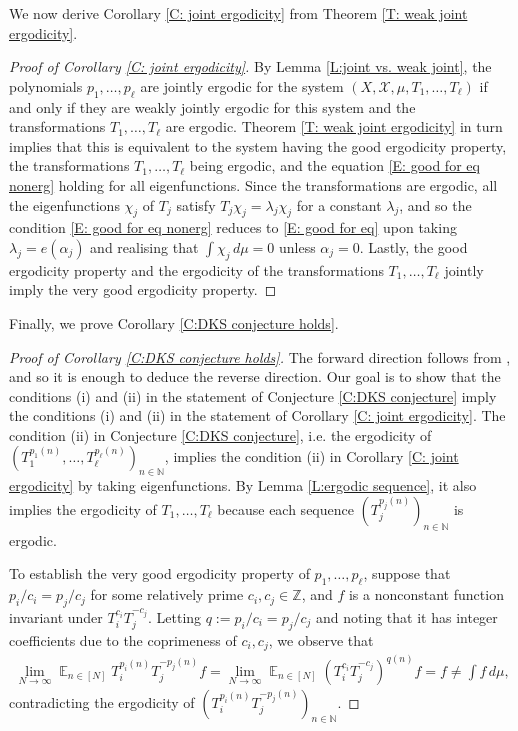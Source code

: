 \documentclass[11pt]{amsart}
\theoremstyle{definition}
\newcommand{\N}{{\mathbb N}}
\newcommand{\Z}{{\mathbb Z}}
\newcommand{\CX}{{\mathcal X}}
\DeclareMathOperator*{\E}{\mathbb{E}}
\begin{document}
We now derive Corollary \ref{C: joint ergodicity} from Theorem \ref{T: weak joint ergodicity}.
\begin{proof}[Proof of Corollary \ref{C: joint ergodicity}]
By Lemma \ref{L:joint vs. weak joint}, the polynomials $p_1, \ldots, p_\ell$ are jointly ergodic for the system $(X, \CX, \mu, T_1, \ldots, T_\ell)$ if and only if they are weakly jointly ergodic for this system and the transformations $T_1, \ldots, T_\ell$ are ergodic. Theorem \ref{T: weak joint ergodicity} in turn implies that this is equivalent to the system having the good ergodicity property, the transformations $T_1, \ldots, T_\ell$ being ergodic, and the equation \eqref{E: good for eq nonerg} holding for all eigenfunctions. Since the transformations are ergodic, all the eigenfunctions $\chi_j$ of $T_j$ satisfy $T_j \chi_j = \lambda_j \chi_j$ for a constant $\lambda_j$, and so the condition \eqref{E: good for eq nonerg} reduces to \eqref{E: good for eq} upon taking $\lambda_j = e(\alpha_j)$ and realising that $\int \chi_j\, d\mu= 0$ unless $\alpha_j = 0$. Lastly, the good ergodicity property and the ergodicity of the transformations $T_1, \ldots, T_\ell$ jointly imply the very good ergodicity property.
\end{proof}

Finally, we prove Corollary \ref{C:DKS conjecture holds}.
\begin{proof}[Proof of Corollary \ref{C:DKS conjecture holds}]
The forward direction follows from \cite[Proposition 5.3]{DKS19}, and so it is enough to deduce the reverse direction. Our goal is to show that the conditions (i) and (ii) in the statement of Conjecture \ref{C:DKS conjecture} imply the conditions (i) and (ii) in the statement of Corollary \ref{C: joint ergodicity}. The condition (ii) in Conjecture \ref{C:DKS conjecture}, i.e. the ergodicity of $(T_1^{p_1(n)}, \ldots, T_\ell^{p_\ell(n)})_{n\in\N}$, implies the condition (ii) in Corollary \ref{C: joint ergodicity} by taking eigenfunctions. By Lemma \ref{L:ergodic sequence}, it also implies the ergodicity of $T_1, \ldots, T_\ell$ because each sequence $(T_j^{p_j(n)})_{n\in\N}$ is ergodic.

To establish the very good ergodicity property of $p_1, \ldots, p_\ell$, suppose that $p_i/c_i = p_j/c_j$ for some relatively prime $c_i, c_j\in\Z$, and $f$ is a nonconstant function invariant under $T_i^{c_i}T_j^{-c_j}$. Letting $q := p_i/c_i = p_j/c_j$ and noting that it has integer coefficients due to the coprimeness of $c_i, c_j$, we observe that
\begin{align*}
    \lim_{N\to\infty}\E_{n\in[N]}T_i^{p_i(n)}T_j^{-p_j(n)}f = \lim_{N\to\infty}\E_{n\in[N]}(T_i^{c_i}T_j^{-c_j})^{q(n)} f = f\neq \int f\, d\mu,
\end{align*}
contradicting the ergodicity of $(T_i^{p_i(n)} T_j^{-p_j(n)})_{n\in\N}$.
\end{proof}
\end{document}

